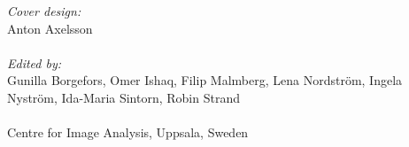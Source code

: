 \documentclass[11pt,twoside,a4paper,titlepage]{article}
\begin{document}
\vfill
\noindent 
{\em Cover design:\/}\\
Anton Axelsson\\%
\\
{\em Edited by:\/}\\
Gunilla Borgefors, Omer Ishaq,  Filip Malmberg, Lena Nordstr\"{o}m, Ingela Nystr\"{o}m, Ida-Maria Sintorn, Robin Strand\\
\\
Centre for Image Analysis, Uppsala, Sweden\\
\\
\\
\\
\addtolength\textheight{2in}
\newpage
\thispagestyle{empty}
\setcounter{tocdepth}{2}
\tableofcontents
\addtolength\textheight{-2in}
\newpage
\thispagestyle{empty}
\mbox{}
\newpage
\setcounter{page}{5}



\newpage
%

\newpage
%

\newpage
%

\newpage


\newpage



\newpage


\newpage



\end{document}
